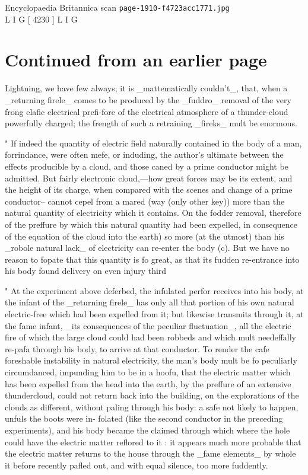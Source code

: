 \documentclass{article}
\begin{document}
\begin{center}
{\Large Encyclopaedia Britannica scan \texttt{page-1910-f4723acc1771.jpg}}\\[0.5em]
L I G [ 4230 ] L I G
\end{center}
\section*{Continued from an earlier page}
Lightning, we have few always; it is \_mattematically couldn’t\_, that, when a \_returning firele\_ comes to be produced by the \_fuddro\_ removal of the very frong elafic electrical prefi-fore of the electrical atmosphere of a thunder-cloud powerfully charged; the frength of such a retraining \_fireks\_ mult be enormous.

" If indeed the quantity of electric field naturally contained in the body of a man, forrindance, were often mefe, or induding, the author's ultimate between the effects producible by a cloud, and those caned by a prime conductor might be admitted. But fairly electronic cloud,—how great forces may be its extent, and the height of its charge, when compared with the scenes and change of a prime conductor-- cannot cepel from a mared (way (only other key)) more than the natural quantity of electricity which it contains. On the fodder removal, therefore of the preffure by which this natural quantity had been expelled, in consequence of the equation of the cloud into the earth) so more (at the utmost) than his \_robole natural lack\_ of electricity can re-enter the body (c). But we have no reason to fopate that this quantity is fo great, as that its fudden re-entrance into his body found delivery on even injury third

" At the experiment above deferbed, the infulated perfor receives into his body, at the infant of the \_returning firele\_ has only all that portion of his own natural electric-free which had been expelled from it; but likewise transmits through it, at the fame infant, \_its consequences of the peculiar fluctuation\_, all the electric fire of which the large cloud could had been robbeds and which mult needeffally re-pafa through his body, to arrive at that conductor. To render the cafe foreshable instability in natural electricity, the man's body mult be fo peculiarly circumdanced, impunding him to be in a hoofu, that the electric matter which has been expelled from the head into the earth, by the preffure of an extensive thundercloud, could not return back into the building, on the explorations of the clouds as different, without paling through his body: a safe not likely to happen, unfuls the boots were in- folated (like the second conductor in the preceding experiments), and his body became the claimed through which where the hole could have the electric matter reflored to it : it appears much more probable that the electric matter returns to the house through the \_fame elements\_ by whole it before recently pafled out, and with equal silence, too more fuddently.
\end{document}
